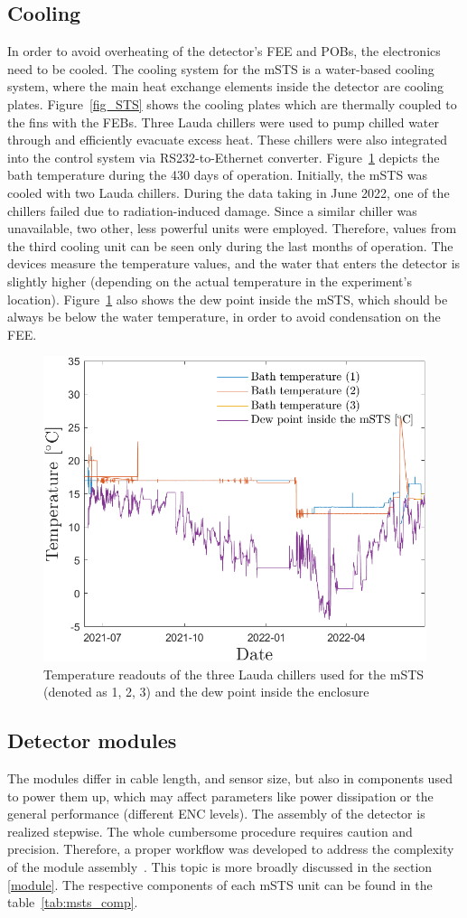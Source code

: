 \subsection{Cooling}
\label{msts_cooling}
In order to avoid overheating of the detector's \gls{FEE} and \glspl{POB}, the electronics need to be cooled. The cooling system for the \gls{mSTS} is a water-based cooling system, where the main heat exchange elements inside the detector are cooling plates.  Figure~\ref{fig_STS} shows the cooling plates which are thermally coupled to the fins with the \glspl{FEB}. Three Lauda chillers were used to pump chilled water through and efficiently evacuate excess heat. These chillers were also integrated into the control system via RS232-to-Ethernet converter. Figure~\ref{fig_cooling} depicts the bath temperature during the 430 days of operation. Initially, the \gls{mSTS} was cooled with two Lauda chillers. During the data taking in June 2022, one of the chillers failed due to radiation-induced damage. Since a similar chiller was unavailable, two other, less powerful units were employed. Therefore, values from the third cooling unit can be seen only during the last months of operation. The devices measure the temperature values, and the water that enters the detector is slightly higher (depending on the actual temperature in the experiment's location). Figure~\ref{fig_cooling} also shows the dew point inside the \gls{mSTS}, which should be always be below the water temperature, in order to avoid condensation on the \gls{FEE}.

\begin{figure}[!h]
\centering
\includegraphics[width=0.6\columnwidth]{Chapter6/DCS/images/cooling.png}
\caption{Temperature readouts of the three Lauda chillers used for the \gls{mSTS} (denoted as 1, 2, 3) and the dew point inside the enclosure}
\label{fig_cooling}
\end{figure}
\newpage
\subsection{Detector modules}
 The modules differ in cable length, and sensor size, but also in components used to power them up, which may affect parameters like power dissipation or the general performance (different ENC levels).  The assembly of the detector is realized stepwise. The whole cumbersome procedure requires caution and precision. Therefore, a proper workflow was developed to address the complexity of the module assembly~\cite{carmen2}. This topic is more broadly discussed in the section \ref{module}. The respective components of each \gls{mSTS} unit can be found in the table~\ref{tab:msts_comp}. 

